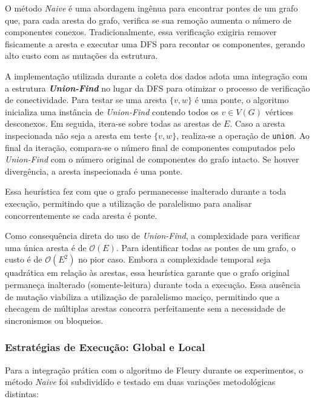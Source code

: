 \documentclass[12pt]{article}
\begin{document}
O método \textit{Naive} é uma abordagem ingênua para encontrar pontes de um grafo que, para cada aresta do grafo, verifica se sua remoção aumenta o número de componentes conexos. Tradicionalmente, essa verificação exigiria remover fisicamente a aresta e executar uma DFS para recontar os componentes, gerando alto custo com as mutações da estrutura.

A implementação utilizada durante a coleta dos dados adota uma integração com a estrutura \textbf{\textit{Union-Find}} no lugar da DFS para otimizar o processo de verificação de conectividade. Para testar se uma aresta $\{v, w\}$ é uma ponte, o algoritmo inicializa uma instância de \textit{Union-Find} contendo todos os $v \in V(G)$ vértices desconexos. Em seguida, itera-se sobre todas as arestas de $E$. Caso a aresta inspecionada não seja a aresta em teste $\{v, w\}$, realiza-se a operação de \texttt{union}. Ao final da iteração, compara-se o número final de componentes computados pelo \textit{Union-Find} com o número original de componentes do grafo intacto. Se houver divergência, a aresta inspecionada é uma ponte.

Essa heurística fez com que o grafo permanecesse inalterado durante a toda execução, permitindo que a utilização de paralelismo para analisar concorrentemente se cada aresta é ponte.

Como consequência direta do uso de \textit{Union-Find}, a complexidade para verificar uma única aresta é de $\mathcal{O}(E)$. Para identificar todas as pontes de um grafo, o custo é de $\mathcal{O}(E^2)$ no pior caso. Embora a complexidade temporal seja quadrática em relação às arestas, essa heurística garante que o grafo original permaneça inalterado (somente-leitura) durante toda a execução. Essa ausência de mutação viabiliza a utilização de paralelismo maciço, permitindo que a checagem de múltiplas arestas concorra perfeitamente sem a necessidade de sincronismos ou bloqueios.

\subsubsection{Estratégias de Execução: Global e Local} \label{naive-strategies}

Para a integração prática com o algoritmo de Fleury durante os experimentos, o método \textit{Naive} foi subdividido e testado em duas variações metodológicas distintas:
\end{document}
